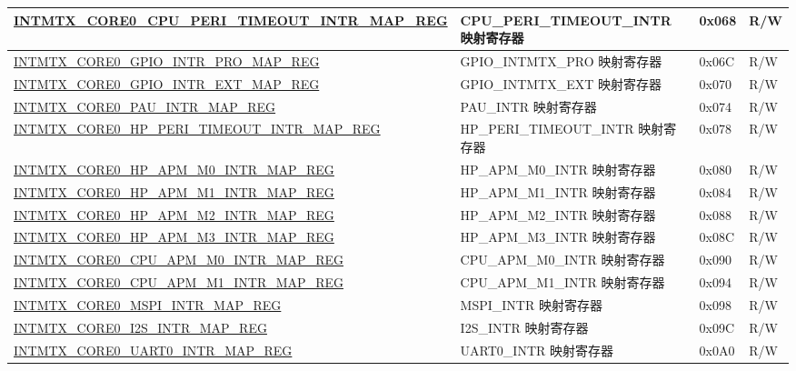 \begin{longtable}{ | p{10cm} | p{10cm} | p{1.3cm} | p{1cm} | }
\hyperref[regdesc:INTMTXCORE0CPUPERITIMEOUTINTRMAPREG]{INTMTX\_CORE0\_CPU\_PERI\_TIMEOUT\_INTR\_MAP\_REG} & CPU\_PERI\_TIMEOUT\_INTR 映射寄存器 & 0x068 & R/W  \\ \hline
\hyperref[regdesc:INTMTXCORE0GPIOINTRPROMAPREG]{INTMTX\_CORE0\_GPIO\_INTR\_PRO\_MAP\_REG} & GPIO\_INTMTX\_PRO 映射寄存器 & 0x06C & R/W  \\ \hline
\hyperref[regdesc:INTMTXCORE0GPIOINTREXTMAPREG]{INTMTX\_CORE0\_GPIO\_INTR\_EXT\_MAP\_REG} & GPIO\_INTMTX\_EXT 映射寄存器 & 0x070 & R/W  \\ \hline
\hyperref[regdesc:INTMTXCORE0PAUINTRMAPREG]{INTMTX\_CORE0\_PAU\_INTR\_MAP\_REG} & PAU\_INTR 映射寄存器 & 0x074 & R/W  \\ \hline
\hyperref[regdesc:INTMTXCORE0HPPERITIMEOUTINTRMAPREG]{INTMTX\_CORE0\_HP\_PERI\_TIMEOUT\_INTR\_MAP\_REG} & HP\_PERI\_TIMEOUT\_INTR 映射寄存器 & 0x078 & R/W  \\ \hline
\hyperref[regdesc:INTMTXCORE0HPAPMM0INTRMAPREG]{INTMTX\_CORE0\_HP\_APM\_M0\_INTR\_MAP\_REG} & HP\_APM\_M0\_INTR 映射寄存器 & 0x080 & R/W  \\ \hline
\hyperref[regdesc:INTMTXCORE0HPAPMM1INTRMAPREG]{INTMTX\_CORE0\_HP\_APM\_M1\_INTR\_MAP\_REG} & HP\_APM\_M1\_INTR 映射寄存器 & 0x084 & R/W  \\ \hline
\hyperref[regdesc:INTMTXCORE0HPAPMM2INTRMAPREG]{INTMTX\_CORE0\_HP\_APM\_M2\_INTR\_MAP\_REG} & HP\_APM\_M2\_INTR 映射寄存器 & 0x088 & R/W  \\ \hline
\hyperref[regdesc:INTMTXCORE0HPAPMM3INTRMAPREG]{INTMTX\_CORE0\_HP\_APM\_M3\_INTR\_MAP\_REG} & HP\_APM\_M3\_INTR 映射寄存器 & 0x08C & R/W  \\ \hline
\hyperref[regdesc:INTMTXCORE0CPUAPMM0INTRMAPREG]{INTMTX\_CORE0\_CPU\_APM\_M0\_INTR\_MAP\_REG} & CPU\_APM\_M0\_INTR 映射寄存器 & 0x090 & R/W  \\ \hline
\hyperref[regdesc:INTMTXCORE0CPUAPMM1INTRMAPREG]{INTMTX\_CORE0\_CPU\_APM\_M1\_INTR\_MAP\_REG} & CPU\_APM\_M1\_INTR 映射寄存器 & 0x094 & R/W  \\ \hline
\hyperref[regdesc:INTMTXCORE0MSPIINTRMAPREG]{INTMTX\_CORE0\_MSPI\_INTR\_MAP\_REG} & MSPI\_INTR 映射寄存器 & 0x098 & R/W  \\ \hline
\hyperref[regdesc:INTMTXCORE0I2SINTRMAPREG]{INTMTX\_CORE0\_I2S\_INTR\_MAP\_REG} & I2S\_INTR 映射寄存器 & 0x09C & R/W  \\ \hline
\hyperref[regdesc:INTMTXCORE0UART0INTRMAPREG]{INTMTX\_CORE0\_UART0\_INTR\_MAP\_REG} & UART0\_INTR 映射寄存器 & 0x0A0 & R/W  \\ \hline

\end{longtable}
